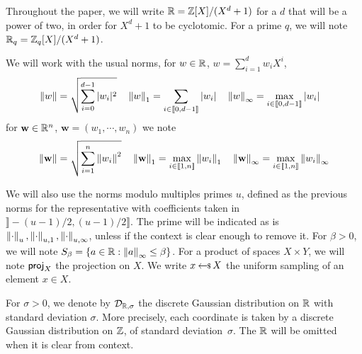 Throughout the paper, we will write $\mathbb{R} = \mathbb{Z}[X]/(X^d + 1)$ for a $d$ that 
will be a power of two, in order for $X^d + 1$ to be cyclotomic. For a prime 
$q$, we will note $\mathbb{R}_q = \mathbb{Z}_q[X]/(X^d + 1)$.

We will work with the usual norms, 
	for $w \in \mathbb{R}$, $w = \sum_{i=1}^d w_i X^i$,
	\begin{align*}
		&\left\lVert w \right\rVert = \sqrt{\sum_{i=0}^{d-1} |w_i|^2} \quad
		\left\lVert w \right\rVert_1 = \sum_{i\in\llbracket 0, d-1 \rrbracket} |w_i| \quad
		\left\lVert w \right\rVert_\infty = \max_{i\in\llbracket 0, d-1 \rrbracket} |w_i|
	\end{align*}
	for $\mathbf{w} \in \mathbb{R}^n$, $\mathbf{w} = (w_1, \cdots, w_n)$ we note
	\begin{align*}
	\left\lVert \mathbf{w} \right\rVert = \sqrt{\sum_{i = 1}^n \left\lVert w_i \right\rVert^2}\quad
	 \left\lVert \mathbf{w} \right\rVert_{1} = \max_{i\in\llbracket 1,n \rrbracket} \left\lVert w_i \right\rVert_{1} \quad
	 \left\lVert \mathbf{w} \right\rVert_{\infty} = \max_{i\in\llbracket 1,n \rrbracket} \left\lVert w_i \right\rVert_{\infty}
	\end{align*}

	We will also use the norms modulo multiples primes $u$, defined as the previous norms for
	the representative with coefficients taken in $\rrbracket-(u-1)/2, (u-1)/2\rrbracket$. The
	prime will be indicated as is $\left\lVert \cdot \right\rVert_{u},\left\lVert \cdot \right\rVert_{u,1},\left\lVert \cdot \right\rVert_{u,\infty}$,
	unless if the context is clear enough to remove it.
%
	For $\beta > 0$, we will note $S_{\beta} = \{ a \in \mathbb{R} : \left\lVert a \right\rVert_\infty \leq \beta\}$.
%
	For a product of spaces $X \times Y$, we will note $\proj_X$ the projection on $X$.
	We write $x \hskip2.3pt{\gets\!\!\mbox{\scriptsize${\$}$\normalsize}}\, X$ the uniform sampling of an element $x \in X$.

	For $\sigma > 0$, we denote by $\mathcal{D}_{\mathbb{R} , \sigma}$ the discrete Gaussian
	distribution on $\mathbb{R}$ with standard deviation $\sigma$. More precisely, each
	coordinate is taken by a discrete Gaussian distribution on $\mathbb{Z}$, of standard deviation~$\sigma$. The $\mathbb{R}$ will be omitted when it is clear from context.


